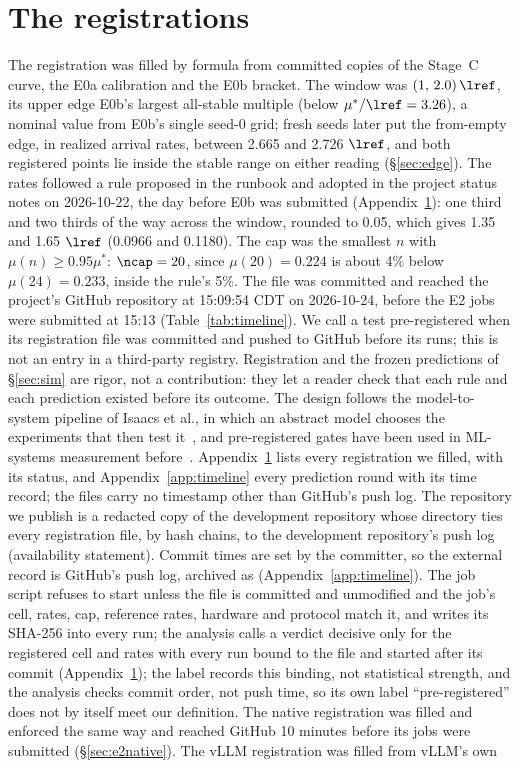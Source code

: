 \section{The registrations}\label{app:prereg}
\begingroup\raggedright
The registration was filled by formula from committed copies of the Stage~C curve, the E0a calibration and the E0b bracket. The window was $(1,\,2.0)\,\lref$, its upper edge E0b's largest all-stable multiple (below $\mu^*/\lref=3.26$), a nominal value from E0b's single seed-0 grid; fresh seeds later put the from-empty edge, in realized arrival rates, between 2.665 and 2.726 $\lref$, and both registered points lie inside the stable range on either reading (\S\ref{sec:edge}). The rates followed a rule proposed in the runbook and adopted in the project status notes on 2026-10-22, the day before E0b was submitted (Appendix~\ref{app:prereg}): one third and two thirds of the way across the window, rounded to 0.05, which gives 1.35 and 1.65 $\lref$ (0.0966 and 0.1180\sps). The cap was the smallest $n$ with $\mu(n)\ge0.95\mu^*$: $\ncap=20$, since $\mu(20)=0.224$ is about 4\% below $\mu(24)=0.233$, inside the rule's 5\%. The file was committed and reached the project's GitHub repository at 15:09:54 CDT on 2026-10-24, before the E2 jobs were submitted at 15:13 (Table~\ref{tab:timeline}). We call a test pre-registered when its registration file was committed and pushed to GitHub before its runs; this is not an entry in a third-party registry. Registration and the frozen predictions of \S\ref{sec:sim} are rigor, not a contribution: they let a reader check that each rule and each prediction existed before its outcome. The design follows the model-to-system pipeline of Isaacs et al., in which an abstract model chooses the experiments that then test it~\citep{isaacs2025analyzing}, and pre-registered gates have been used in ML-systems measurement before~\citep{suram2026cacheable}. Appendix~\ref{app:prereg} lists every registration we filled, with its status, and Appendix~\ref{app:timeline} every prediction round with its time record; the files carry no timestamp other than GitHub's push log. The repository we publish is a redacted copy of the development repository whose  directory ties every registration file, by hash chains, to the development repository's push log (availability statement). Commit times are set by the committer, so the external record is GitHub's push log, archived as  (Appendix~\ref{app:timeline}). The job script refuses to start unless the file is committed and unmodified and the job's cell, rates, cap, reference rates, hardware and protocol match it, and writes its SHA-256 into every run; the analysis calls a verdict decisive only for the registered cell and rates with every run bound to the file and started after its commit (Appendix~\ref{app:prereg}); the label records this binding, not statistical strength, and the analysis checks commit order, not push time, so its own label ``pre-registered'' does not by itself meet our definition. The native registration was filled and enforced the same way and reached GitHub 10 minutes before its jobs were submitted (\S\ref{sec:e2native}). The vLLM registration was filled from vLLM's own 
